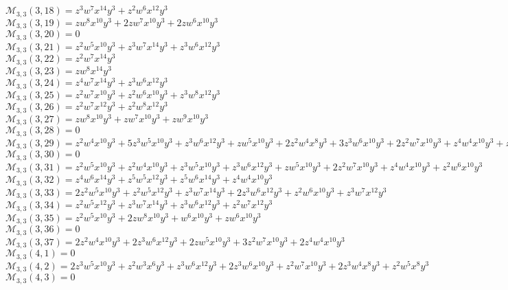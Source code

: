 $\mathcal{M}_{3,3}(3,18)=z^3w^7x^{14}y^3+z^2w^6x^{12}y^3$\\
$\mathcal{M}_{3,3}(3,19)=zw^8x^{10}y^3+2zw^7x^{10}y^3+2zw^6x^{10}y^3$\\
$\mathcal{M}_{3,3}(3,20)=0$\\
$\mathcal{M}_{3,3}(3,21)=z^2w^5x^{10}y^3+z^3w^7x^{14}y^3+z^3w^6x^{12}y^3$\\
$\mathcal{M}_{3,3}(3,22)=z^2w^7x^{14}y^3$\\
$\mathcal{M}_{3,3}(3,23)=zw^8x^{14}y^3$\\
$\mathcal{M}_{3,3}(3,24)=z^4w^7x^{14}y^3+z^3w^6x^{12}y^3$\\
$\mathcal{M}_{3,3}(3,25)=z^2w^7x^{10}y^3+z^2w^6x^{10}y^3+z^3w^8x^{12}y^3$\\
$\mathcal{M}_{3,3}(3,26)=z^2w^7x^{12}y^3+z^2w^8x^{12}y^3$\\
$\mathcal{M}_{3,3}(3,27)=zw^8x^{10}y^3+zw^7x^{10}y^3+zw^9x^{10}y^3$\\
$\mathcal{M}_{3,3}(3,28)=0$\\
$\mathcal{M}_{3,3}(3,29)=z^2w^4x^{10}y^3+5z^3w^5x^{10}y^3+z^3w^6x^{12}y^3+zw^5x^{10}y^3+2z^2w^4x^8y^3+3z^3w^6x^{10}y^3+2z^2w^7x^{10}y^3+z^4w^4x^{10}y^3+z^2w^5x^8y^3$\\
$\mathcal{M}_{3,3}(3,30)=0$\\
$\mathcal{M}_{3,3}(3,31)=z^2w^5x^{10}y^3+z^2w^4x^{10}y^3+z^3w^5x^{10}y^3+z^3w^6x^{12}y^3+zw^5x^{10}y^3+2z^2w^7x^{10}y^3+z^4w^4x^{10}y^3+z^2w^6x^{10}y^3$\\
$\mathcal{M}_{3,3}(3,32)=z^4w^6x^{14}y^3+z^5w^5x^{12}y^3+z^5w^6x^{14}y^3+z^4w^4x^{10}y^3$\\
$\mathcal{M}_{3,3}(3,33)=2z^2w^5x^{10}y^3+z^2w^5x^{12}y^3+z^3w^7x^{14}y^3+2z^3w^6x^{12}y^3+z^2w^6x^{10}y^3+z^3w^7x^{12}y^3$\\
$\mathcal{M}_{3,3}(3,34)=z^2w^5x^{12}y^3+z^3w^7x^{14}y^3+z^3w^6x^{12}y^3+z^2w^7x^{12}y^3$\\
$\mathcal{M}_{3,3}(3,35)=z^2w^5x^{10}y^3+2zw^8x^{10}y^3+w^6x^{10}y^3+zw^6x^{10}y^3$\\
$\mathcal{M}_{3,3}(3,36)=0$\\
$\mathcal{M}_{3,3}(3,37)=2z^2w^4x^{10}y^3+2z^3w^6x^{12}y^3+2zw^5x^{10}y^3+3z^2w^7x^{10}y^3+2z^4w^4x^{10}y^3$\\
$\mathcal{M}_{3,3}(4,1)=0$\\
$\mathcal{M}_{3,3}(4,2)=2z^3w^5x^{10}y^3+z^2w^3x^6y^3+z^3w^6x^{12}y^3+2z^3w^6x^{10}y^3+z^2w^7x^{10}y^3+2z^3w^4x^8y^3+z^2w^5x^8y^3$\\
$\mathcal{M}_{3,3}(4,3)=0$\\
